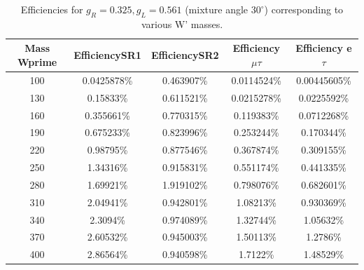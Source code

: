  \begin{table}[htb]
 	\centering
  	\begin{tabular}{|ccccc|}
  		\hline 
  		Mass Wprime & EfficiencySR1 & EfficiencySR2 & Efficiency $\mu$$\tau$ & Efficiency e $\tau$ \\
\hline 
  		100&0.0425878\%&0.463907\%&0.0114524\%&0.00445605\%\\
        	130& 0.15833\%& 0.611521\%& 0.0215278\%& 0.0225592\%\\
        	160&0.355661\%&0.770315\%&0.119383\%&0.0712268\%\\
          	190& 0.675233\%& 0.823996\%& 0.253244\%& 0.170344\%\\
                220&0.98795\%&0.877546\%&0.367874\%&0.309155\%\\
                250&1.34316\%&0.915831\%&0.551174\%&0.441335\%\\ 
          	280& 1.69921\%& 1.919102\%& 0.798076\%& 0.682601\%\\
                310&2.04941\%&0.942801\%&1.08213\%&0.930369\%\\
                340& 2.3094\%& 0.974089\%& 1.32744\%& 1.05632\%\\ 
                370& 2.60532\%& 0.945003\%& 1.50113\%& 1.2786\%\\
        	400& 2.86564\%&0.940598\%&1.7122\%&1.48529\%\\

  		\hline
  	\end{tabular}
  	\caption{Efficiencies for  $ g_R=0.325, g_L=0.561  $ (mixture angle $30^\circ$) corresponding to various W' masses. \label{eff-mix30} }
  \end{table}

